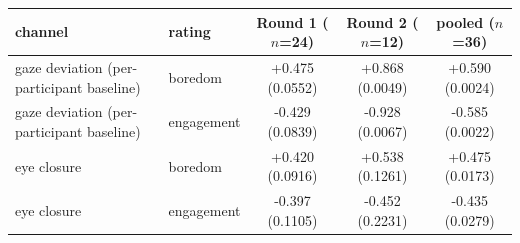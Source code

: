 \begin{tabular}{llccc}
\hline
channel & rating & Round 1 ($n$=24) & Round 2 ($n$=12) & pooled ($n$=36) \\
\hline
gaze deviation (per-participant baseline) & boredom & +0.475 (0.0552) & +0.868 (0.0049) & +0.590 (0.0024) \\
gaze deviation (per-participant baseline) & engagement & -0.429 (0.0839) & -0.928 (0.0067) & -0.585 (0.0022) \\
eye closure & boredom & +0.420 (0.0916) & +0.538 (0.1261) & +0.475 (0.0173) \\
eye closure & engagement & -0.397 (0.1105) & -0.452 (0.2231) & -0.435 (0.0279) \\
\hline
\end{tabular}
